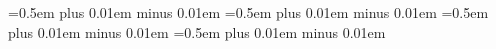 \usepackage{xpatch}%
\xapptocmd\normalsize{%
\abovedisplayskip=0.5em plus 0.01em minus 0.01em
\abovedisplayshortskip=0.5em plus 0.01em minus 0.01em
\belowdisplayskip=0.5em plus 0.01em minus 0.01em
\belowdisplayshortskip=0.5em plus 0.01em minus 0.01em
}{}{}


